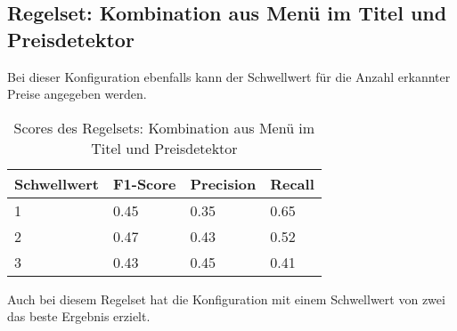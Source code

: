 \subsection{Regelset: Kombination aus Menü im Titel und Preisdetektor}
Bei dieser Konfiguration ebenfalls kann der Schwellwert für die Anzahl erkannter Preise angegeben werden.\\
\begin{table}[H]
	\caption{Scores des Regelsets: Kombination aus Menü im Titel und Preisdetektor}
	\centering
\begin{tabular}{|l|l|l|l|}
	\hline
	Schwellwert & F1-Score & Precision & Recall\\
	\hline
	1 & 0.45 & 0.35 & 0.65 \\
	2 & 0.47 & 0.43 & 0.52 \\
	3 & 0.43 & 0.45 & 0.41 \\
	\hline
\end{tabular}
\end{table}
Auch bei diesem Regelset hat die Konfiguration mit einem Schwellwert von zwei das beste Ergebnis erzielt.
